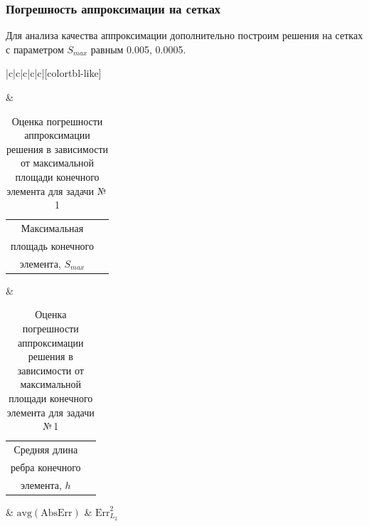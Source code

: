 \documentclass[12pt, a4paper]{article}
\begin{document}
	
	
	
		\newpage
				
		\subsubsection{Погрешность аппроксимации на сетках}
			
			Для анализа качества аппроксимации дополнительно построим решения на сетках с параметром $S_{max}$ равным 0.005, 0.0005. 
			
			\vspace*{-1mm}
			\begin{table}[!h]
				\centering
				\caption{\label{table_comparison} Оценка погрешности аппроксимации решения в зависимости от максимальной площади конечного элемента для задачи №\,1}
				\vspace*{2mm}
				\begin{NiceTabular}{|c|c|c|c|c|}[colortbl-like]
					
					\hline
					& \begin{tabular}[c]{@{}c@{}c@{}}Максимальная \\ площадь конечного\\  элемента, $S_{max}$ \end{tabular}
					& \begin{tabular}[c]{@{}c@{}c@{}}Средняя длина\\ ребра конечного\\  элемента, $h$ \end{tabular}
					& $\mathrm{avg}(\mathrm{AbsErr})$
					& $\mathrm{Err}_{L_2}^2$  \\
					

\end{NiceTabular}
\end{table}
\end{document}
